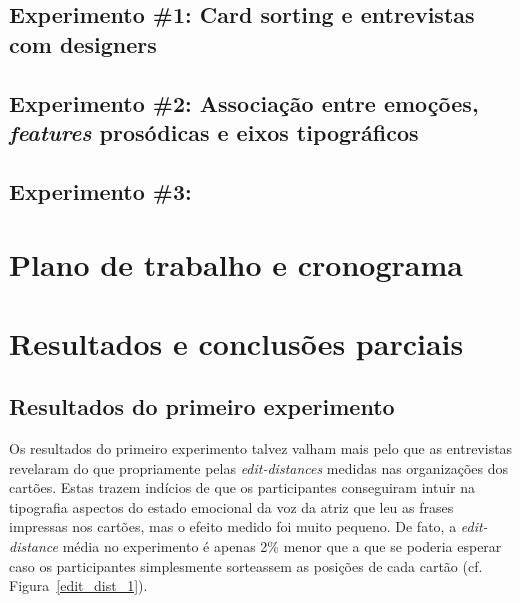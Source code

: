 \documentclass{tufte-handout}
\begin{document}
\subsection{Experimento \#1: Card sorting e entrevistas com designers}\label{sec:met_exp_2}

\subsection{Experimento \#2: Associação entre emoções, \textit{features} prosódicas e eixos tipográficos}\label{sec:met_exp_2}

\subsection{Experimento \#3: }\label{sec:met_exp_2}

\section{Plano de trabalho e cronograma}\label{sec:plano_de_trabalho}

\section{Resultados e conclusões parciais}\label{sec:resultados}

\subsection{Resultados do primeiro experimento}

Os resultados do primeiro experimento talvez valham mais pelo que as entrevistas revelaram do que propriamente pelas \textit{edit-distances} medidas nas organizações dos cartões. Estas trazem indícios de que os participantes conseguiram intuir na tipografia aspectos do estado emocional da voz da atriz que leu  as frases impressas nos cartões, mas o efeito medido foi muito pequeno. De fato, a \textit{edit-distance} média no experimento é apenas 2\% menor que a que se poderia esperar caso os participantes simplesmente sorteassem as posições de cada cartão (cf. Figura~\ref{edit_dist_1}).
\end{document}
